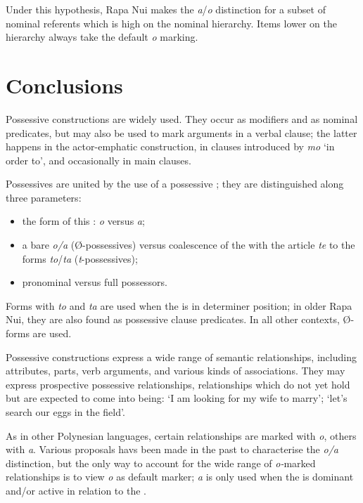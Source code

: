 Under this hypothesis, Rapa Nui makes the \textit{{\ꞌ}a}/\textit{o} distinction for a subset of nominal referents which is high on the nominal hierarchy. Items lower on the hierarchy always take the default \textit{o} marking.

\section{Conclusions}\label{sec:6.4}

Possessive constructions are widely used. They occur as  modifiers and as nominal predicates, but may also be used to mark arguments in a verbal clause; the latter happens in the actor-emphatic construction, in clauses introduced by \textit{mo} ‘in order to’, and occasionally in main clauses.

Possessives are united by the use of a possessive ; they are distinguished along three parameters:

\begin{itemize}
\item 
the form of this : \textit{o} versus \textit{{\ꞌ}a}; 

\item 
a bare  \textit{o/{\ꞌ}a} (Ø-possessives) versus coalescence of the  with the article \textit{te} to the forms \textit{to}/\textit{ta} (\textit{t}{}-possessives); 

\item 
pronominal versus full  possessors.

\end{itemize}

Forms with \textit{to} and \textit{ta} are used when the  is in determiner position; in older Rapa Nui, they are also found as possessive clause predicates. In all other contexts, Ø-forms are used.

Possessive constructions express a wide range of semantic relationships, including attributes, parts, verb arguments, and various kinds of associations. They may express prospective possessive relationships, relationships which do not yet hold but are expected to come into being: ‘I am looking for my wife to marry’; ‘let’s search our eggs in the field’.

As in other Polynesian languages, certain relationships are marked with \textit{o}, others with \textit{{\ꞌ}a}. Various proposals havs been made in the past to characterise the \textit{o/a} distinction, but the only way to account for the wide range of \textit{o-}marked relationships is to view \textit{o} as default marker; \textit{{\ꞌ}a} is only used when the  is dominant and/or active in relation to the .

